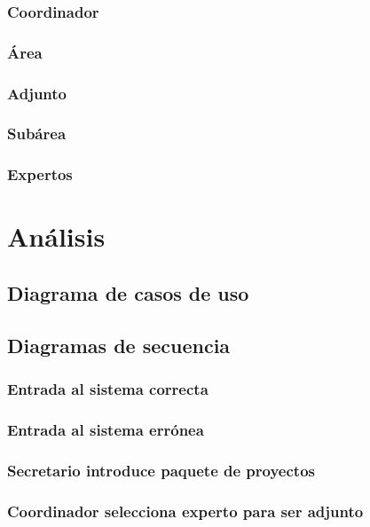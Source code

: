 \documentclass[11pt,a4paper,spanish,twoside]{book}
\begin{document}
\subsection{Coordinador}

\subsection{Área}

\subsection{Adjunto}

\subsection{Subárea}

\subsection{Expertos}

\chapter{Análisis}

\section{Diagrama de casos de uso}

\section{Diagramas de secuencia}

\subsection{Entrada al sistema correcta}

\subsection{Entrada al sistema errónea}

\subsection{Secretario introduce paquete de proyectos}

\subsection{Coordinador selecciona experto para ser adjunto}
\end{document}
